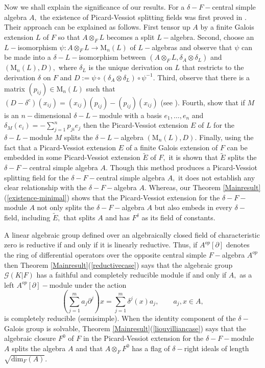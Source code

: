 \documentclass[preprint, 11pt]{amsart}
\theoremstyle{corollary}
\theoremstyle{remark}
\theoremstyle{proposition}
\numberwithin{equation}{subsection}
\begin{document}
	Now we shall explain the significance  of our results. For a $\delta-F-$central simple algebra $A,$ the existence of Picard-Vessiot splitting fields was first proved in \cite[Theorem 1]{JM08}. Their approach can be explained as follows. First tensor up $A$ by a finite Galois extension $L$ of $F$ so that $A\otimes_F L$ becomes a split $L-$algebra. Second, choose  an $L-$isomorphism $\psi: A\otimes_F L\to \mathrm{M}_n(L)$ of $L-$algebras and observe that  $\psi$ can be made into a $\delta-L-$isomorphism between $(A\otimes_F L, \delta_A\otimes \delta_L)$ and $(\mathrm{M}_n(L), D),$ where $\delta_L$  is the unique derivation  on $L$ that restricts to the derivation $\delta$ on $F$ and $D:=\psi\circ(\delta_A\otimes \delta_L)\circ \psi^{-1}.$  Third,  observe that there is a matrix $(p_{ij})\in \mathrm{M}_n(L)$ such that $(D-\delta^c) (x_{ij})=(x_{ij})(p_{ij})-(p_{ij})(x_{ij})$ (see \cite[Proposition 1]{JM08}). Fourth, show that  if $M$ is an $n-$dimensional $\delta-L-$module with a basis $e_1,\dots, e_n$ and  $\delta_M(e_i)=-\sum^n_{j=1}p_{ji}e_j$ then 
	the Picard-Vessiot extension $E$ of $L$ for the $\delta-L-$module $M$  splits the $\delta-L-$algebra $(\mathrm{M}_n(L), D).$ Finally, using the fact that a Picard-Vessiot extension $E$ of a finite Galois extension of $F$ can be embedded in some Picard-Vessiot extension $\tilde{E}$ of $F,$ it is shown that $\tilde{E}$ splits the $\delta-F-$central simple algebra $A.$  Though this method produces a  Picard-Vessiot splitting field for the $\delta-F-$central simple algebra $A,$ it does not establish any clear relationship with the $\delta-F-$algebra $A.$ Whereas, our Theorem \ref{Mainresult} (\ref{existence-minimal}) shows that the Picard-Vessiot extension for the $\delta-F-$module $A$ not only splits the $\delta-F-$algebra $A$ but also embeds in  every $\delta-$field,  including $\tilde{E},$ that splits $A$ and has $F^{\delta}$ as its field of constants.
	
	A linear algebraic group defined over an algebraically closed field of characteristic zero is reductive if and only if it is linearly reductive. Thus, if $A^{op}[\partial]$ denotes the ring of differential operators over the opposite central simple $F-$algebra $A^{op}$ then Theorem \ref{Mainresult}(\ref{reductivecase}) says that the algebraic group $\mathscr{G}(K|F)$ has a faithful and completely reducible module if and only if $A,$ as a left $A^{op}[\partial]-$module under the action $$\left(\sum^m_{j=1}a_j\partial^j\right)x=\sum^m_{j=1} \delta^j(x) a_j,\qquad a_j, x\in A,$$ is completely reducible (semisimple). When the identity component of the $\delta-$Galois group  is solvable, Theorem \ref{Mainresult}(\ref{liouvilliancase}) says that the algebraic closure $F^0$ of $F$ in the Picard-Vessiot extension for the $\delta-F-$module $A$ splits the algebra $A$ and that $A\otimes_F F^0$ has a flag of $\delta-$right ideals of length $\sqrt{\mathrm{dim}_F(A)}.$ 
	
\end{document}
